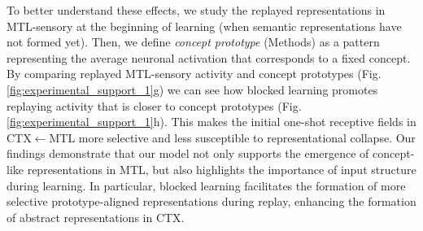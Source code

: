 \documentclass{article}
\begin{document}
\newline\newline
To better understand these effects, we study the replayed representations in MTL-sensory at the beginning of learning (when semantic representations have not formed yet). Then, we define \textit{concept prototype} (Methods) as a pattern representing the average neuronal activation that corresponds to a fixed concept. By comparing replayed MTL-sensory activity and concept prototypes (Fig. \ref{fig:experimental_support_1}g) we can see how blocked learning promotes replaying activity that is closer to concept prototypes (Fig. \ref{fig:experimental_support_1}h). This makes the initial one-shot receptive fields in CTX$\leftarrow$MTL more selective and less susceptible to representational collapse.
\newline\newline
Our findings demonstrate that our model not only supports the emergence of concept-like representations in MTL, but also highlights the importance of input structure during learning. In particular, blocked learning facilitates the formation of more selective prototype-aligned representations during replay, enhancing the formation of abstract representations in CTX.
\end{document}
